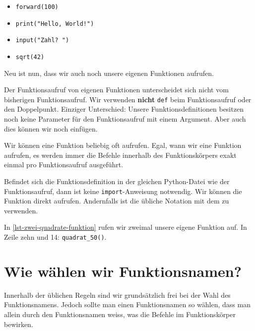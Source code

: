 \begin{itemize}
\item \lstinline{forward(100)}
\item \lstinline{print("Hello, World!")}
\item \lstinline{input("Zahl? ")}
\item \lstinline{sqrt(42)}
\end{itemize}

Neu ist nun, dass wir auch noch unsere eigenen Funktionen aufrufen.

\begin{hinweis}
Der Funktionsaufruf von eigenen Funktionen unterscheidet sich nicht vom bisherigen Funktionsaufruf. Wir verwenden \textbf{nicht} \lstinline{def} beim Funktionsaufruf oder den Doppelpunkt. Einziger Unterschied: Unsere Funktionsdefinitionen besitzen noch keine Parameter für den Funktionsaufruf mit einem Argument. Aber auch dies können wir noch einfügen.
\end{hinweis}

Wir können eine Funktion beliebig oft aufrufen. Egal, wann wir eine Funktion aufrufen, es werden immer die Befehle innerhalb des Funktionskörpers exakt einmal pro Funktionsaufruf ausgeführt.

\begin{important}
Befindet sich die Funktionsdefinition in der gleichen Python-Datei wie der Funktionsaufruf, dann ist keine \lstinline{import}-Anweisung notwendig. Wir können die Funktion direkt aufrufen. Andernfalls ist die übliche Notation mit dem  zu verwenden.
\end{important}

\begin{example}

In \autoref{lst-zwei-quadrate-funktion} rufen wir zweimal unsere eigene Funktion auf. In Zeile zehn und 14: \texttt{quadrat\_50()}.

\end{example}

\section{Wie wählen wir Funktionsnamen?}

Innerhalb der üblichen Regeln sind wir grundsätzlich frei bei der Wahl des Funktionsnamens. Jedoch sollte man einen Funktionsnamen so wählen, dass man allein durch den Funktionsnamen weiss, was die Befehle im Funktionskörper bewirken.

